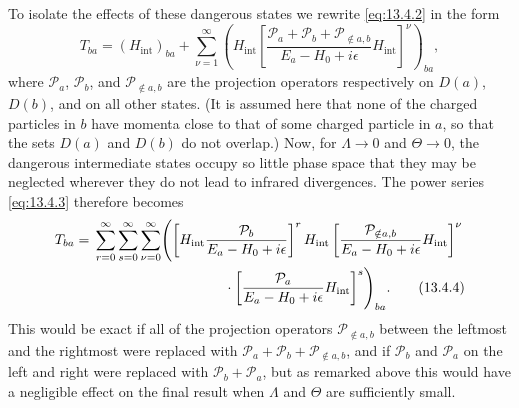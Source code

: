 To isolate the effects of these dangerous states we rewrite
\eqref{eq:13.4.2} in the form
\begin{equation}
T_{ba}=(H_{\mathrm{int}})_{ba}
+\sum_{\nu=1}^{\infty}
\left(H_{\mathrm{int}}
\left[\frac{\mathcal P_a+\mathcal P_b+\mathcal P_{\notin a,b}}
{E_a-H_0+i\epsilon}H_{\mathrm{int}}\right]^\nu\right)_{ba},
\tag{13.4.3}\label{eq:13.4.3}
\end{equation}
where $\mathcal P_a$, $\mathcal P_b$, and $\mathcal P_{\notin a,b}$ are the
projection operators respectively on $D(a)$, $D(b)$, and on all other states.
(It is assumed here that none of the charged particles in $b$ have momenta
close to that of some charged particle in $a$, so that the sets $D(a)$ and
$D(b)$ do not overlap.) Now, for $\Lambda\to0$ and $\Theta\to0$, the dangerous
intermediate states occupy so little phase space that they may be neglected
wherever they do not lead to infrared divergences. The power series
\eqref{eq:13.4.3} therefore becomes
\begin{align}
T_{ba}={}&\sum_{r=0}^{\infty}\sum_{s=0}^{\infty}
\sum_{\nu=0}^{\infty}
\Biggl(
\left[H_{\mathrm{int}}\frac{\mathcal P_b}{E_a-H_0+i\epsilon}\right]^r
H_{\mathrm{int}}
\left[\frac{\mathcal P_{\notin a,b}}{E_a-H_0+i\epsilon}
H_{\mathrm{int}}\right]^\nu\notag\\
&\hspace{33mm}\cdot
\left[\frac{\mathcal P_a}{E_a-H_0+i\epsilon}
H_{\mathrm{int}}\right]^s
\Biggr)_{ba}.
\tag{13.4.4}\label{eq:13.4.4}
\end{align}
This would be exact if all of the projection operators
$\mathcal P_{\notin a,b}$ between the leftmost and the rightmost were replaced
with $\mathcal P_a+\mathcal P_b+\mathcal P_{\notin a,b}$, and if
$\mathcal P_b$ and $\mathcal P_a$ on the left and right were replaced with
$\mathcal P_b+\mathcal P_a$, but as remarked above this would have a negligible
effect on the final result when $\Lambda$ and $\Theta$ are sufficiently small.

